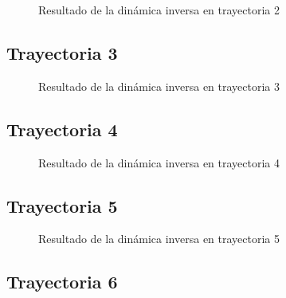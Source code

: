         \begin{figure}[h]
            \centering
            
            \caption{Resultado de la dinámica inversa en trayectoria 2}
            \label{f:cap7_tray2}
        \end{figure}
        
        \newpage

        
    \subsection{Trayectoria 3}
    
        \begin{figure}[h]
            \centering
            
            \caption{Resultado de la dinámica inversa en trayectoria 3}
            \label{f:cap7_tray3}
        \end{figure}

                
    \subsection{Trayectoria 4}
    
        \begin{figure}[h]
            \centering
            
            \caption{Resultado de la dinámica inversa en trayectoria 4}
            \label{f:cap7_tray4}
        \end{figure}
        

        \newpage


    \subsection{Trayectoria 5}
    
        \begin{figure}[h]
            \centering
            
            \caption{Resultado de la dinámica inversa en trayectoria 5}
            \label{f:cap7_tray5}
        \end{figure}

                
    \subsection{Trayectoria 6}
    
